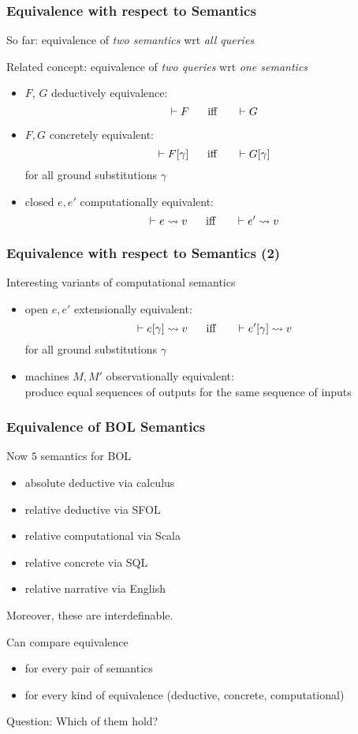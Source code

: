 \begin{frame}\frametitle{Equivalence with respect to Semantics}
So far: equivalence of \emph{two semantics} wrt \emph{all queries}

Related concept: equivalence of \emph{two queries} wrt \emph{one semantics}
\begin{itemize}
\item $F$, $G$ deductively equivalence: \[\vdash F \hspace*{.5cm}\;\mathrm{iff}\;\hspace*{.5cm} \vdash G\]
\item $F,G$ concretely equivalent: \[\vdash F[\gamma] \hspace*{.5cm}\;\mathrm{iff}\;\hspace*{.5cm} \vdash G[\gamma]\] for all ground substitutions $\gamma$
\item closed $e,e'$ computationally equivalent: \[\vdash e\rightsquigarrow v \hspace*{.5cm}\;\mathrm{iff}\;\hspace*{.5cm} \vdash e'\rightsquigarrow v\]
\end{itemize}
\end{frame}

\begin{frame}\frametitle{Equivalence with respect to Semantics (2)}
Interesting variants of computational semantics
\begin{itemize}
\item open $e,e'$ extensionally equivalent:
  \[\vdash e[\gamma]\rightsquigarrow v \hspace*{.5cm}\;\mathrm{iff}\;\hspace*{.5cm} \vdash e'[\gamma]\rightsquigarrow v\]
  for all ground substitutions $\gamma$
\item machines $M,M'$ observationally equivalent: \\
  produce equal sequences of outputs for the same sequence of inputs
\end{itemize}

\end{frame}

\begin{frame}\frametitle{Equivalence of BOL Semantics}
Now $5$ semantics for BOL
\begin{itemize}
\item absolute deductive via calculus
\item relative deductive via SFOL
\item relative computational via Scala
\item relative concrete via SQL
\item relative narrative via English
\end{itemize}
Moreover, these are interdefinable.

Can compare equivalence
\begin{itemize}
\item for every pair of semantics
\item for every kind of equivalence (deductive, concrete, computational)
\end{itemize}
Question: Which of them hold?
\end{frame}

